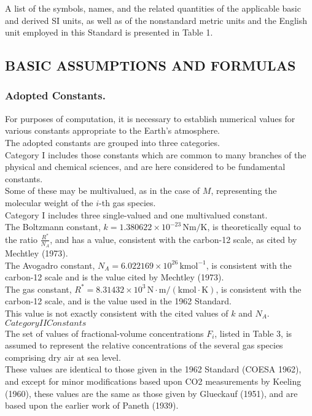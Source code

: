 \documentclass{article}
\begin{document}
A list of the symbols, names, and the related quantities of the applicable basic and derived SI units, as well as of the nonstandard metric units and the English unit employed in this Standard is presented in Table 1.\\

\subsection{BASIC ASSUMPTIONS AND FORMULAS}
\subsubsection{Adopted Constants.}

For purposes of computation, it is necessary to establish numerical values for various constants appropriate to the Earth's atmosphere.\\
The adopted constants are grouped into three categories.\\

Category I includes those constants which are common to many branches of the physical and chemical sciences, and are here considered to be fundamental constants.\\
Some of these may be multivalued, as in the case of $M$, representing the molecular weight of the $i$-th gas species.\\
Category I includes three single-valued and one multivalued constant.\\

The Boltzmann constant, $k = 1.380622 \times 10^{-23} \, \mathrm{Nm/K}$, is theoretically equal to the ratio $\frac{R^*}{N_A}$, and has a value, consistent with the carbon-12 scale, as cited by Mechtley (1973).\\

The Avogadro constant, $N_A = 6.022169 \times 10^{26} \, \mathrm{kmol}^{-1}$, is consistent with the carbon-12 scale and is the value cited by Mechtley (1973).\\

The gas constant, $R^* = 8.31432 \times 10^{3} \, \mathrm{N \cdot m / (kmol \cdot K)}$, is consistent with the carbon-12 scale, and is the value used in the 1962 Standard.\\
This value is not exactly consistent with the cited values of $k$ and $N_A$.\\

$Category II Constants$\\

The set of values of fractional-volume concentrations $F_i$, listed in Table 3, is assumed to represent the relative concentrations of the several gas species comprising dry air at sea level.\\
These values are identical to those given in the 1962 Standard (COESA 1962), and except for minor modifications based upon CO2 measurements by Keeling (1960), these values are the same as those given by Glueckauf (1951), and are based upon the earlier work of Paneth (1939).\\
\end{document}
